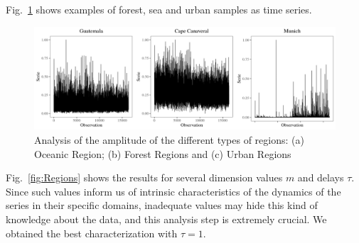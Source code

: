 \documentclass{isprs}
\begin{document}
	
	Fig.~\ref{fig:AmplitudeSAR} shows examples of forest, sea and urban samples as time series.
	
	\begin{figure}[hbt]
		\includegraphics[width=\columnwidth]{Figures/SAR_signal.pdf}
		\caption{Analysis of the amplitude of the different types of regions: (a) Oceanic Region; (b) Forest Regions and (c) Urban Regions}
		\label{fig:AmplitudeSAR}
	\end{figure}
	
	
	Fig.~\ref{fig:Regions} shows the results for several dimension values $m$ and delays $\tau$.
	Since such values inform us of intrinsic characteristics of the dynamics of the series in their specific domains, inadequate values may hide this kind of knowledge about the data, and this analysis step is extremely crucial.
	We obtained the best characterization with $\tau = 1$.
	
\end{document}
